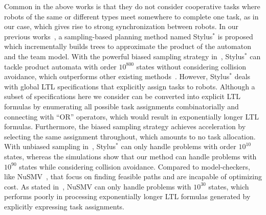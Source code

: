 \documentclass[Afour,sageh,times]{sagej}
\begin{document}
Common in the above works is that they do not consider cooperative tasks where robots of the same or different types meet somewhere to complete one task, as in our case,  which gives rise to strong synchronization between robots. In our previous works~\citep{kantaros2018sampling,kantaros2020stylus}, a sampling-based planning method named  Stylus$^*$ is proposed which incrementally builds trees to approximate the product of the automaton and the team model. With the powerful biased sampling strategy in~\cite{kantaros2020stylus}, Stylus$^*$ can tackle product automata with order $10^{800}$ states without considering collision avoidance, which outperforms other existing methods~\citep{ulusoy2013optimality,kantaros2017sampling}. However, Stylus$^*$ deals with global LTL specifications that explicitly assign tasks to robots. Although a subset of specifications here we consider can be converted into explicit LTL formulas by enumerating all possible task assignments combinatorially and connecting with ``OR'' operators, which would result in exponentially longer LTL formulas. Furthermore, the biased sampling strategy achieves acceleration by selecting the same assignment throughout, which amounts to no task allocation. With unbiased sampling in~\cite{kantaros2018sampling}, Stylus$^*$ can only handle problems with order $10^{10}$ states, whereas the simulations  show that our method can handle problems with $10^{90}$ states while considering collision avoidance. Compared to model-checkers, like NuSMV~\citep{cimatti2002nusmv}, that focus on finding feasible paths and are incapable of  optimizing cost. As stated in~\cite{kantaros2020stylus}, NuSMV can only  handle problems with $10^{30}$ states, which  performs poorly in  processing exponentially longer LTL formulas generated by explicitly expressing task assignments.
\end{document}
